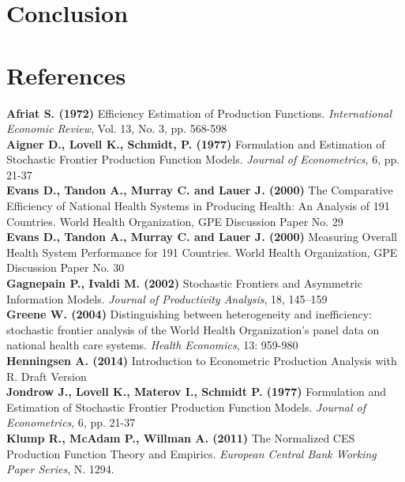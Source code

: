\documentclass[12pt,a4paper]{article}\usepackage[]{graphicx}\usepackage[]{color}
\begin{document}
\section{Conclusion}



\newpage
\section{References}
\textbf{Afriat S. (1972)} Efficiency Estimation of Production Functions. \textit{International Economic Review}, Vol. 13, No. 3, pp. 568-598 \\

\textbf{Aigner D., Lovell K., Schmidt, P. (1977)} Formulation and Estimation of Stochastic Frontier Production Function Models. \textit{Journal of Econometrics}, 6, pp. 21-37 \\

\textbf{Evans D., Tandon A., Murray C. and Lauer J. (2000)} The Comparative Efficiency of National Health Systems in Producing Health: An Analysis of 191 Countries. World Health Organization, GPE Discussion Paper No. 29 \\

\textbf{Evans D., Tandon A., Murray C. and Lauer J. (2000)} Measuring Overall Health System Performance for 191 Countries. World Health Organization, GPE Discussion Paper No. 30 \\

\textbf{Gagnepain P., Ivaldi M. (2002)} Stochastic Frontiers and Asymmetric Information Models. \textit{Journal of Productivity Analysis}, 18, 145–159 \\

\textbf{Greene W. (2004)} Distinguishing between heterogeneity and inefficiency: stochastic frontier analysis of the World Health Organization's panel data on national health care systems. \textit{Health Economics}, 13: 959-980 \\

\textbf{Henningsen A. (2014)} Introduction to Econometric Production Analysis with R. Draft Version \\

\textbf{Jondrow J., Lovell K., Materov I., Schmidt P. (1977)} Formulation and Estimation of Stochastic Frontier Production Function Models. \textit{Journal of Econometrics}, 6, pp. 21-37 \\

\textbf{Klump R., McAdam P., Willman A. (2011)} The Normalized CES Production Function Theory and Empirics. \textit{European Central Bank Working Paper Series}, N. 1294. \\
\end{document}
